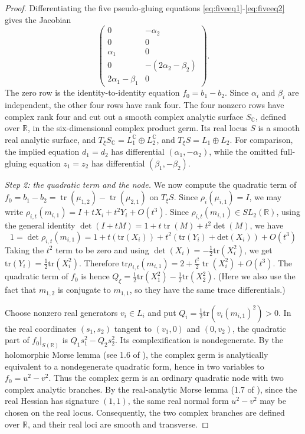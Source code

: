 \documentclass{article}
\DeclareMathOperator{\tr}{tr}
\theoremstyle{plain}
\theoremstyle{definition}
\theoremstyle{plain}
\theoremstyle{plain}
\theoremstyle{plain}
\theoremstyle{remark}
\theoremstyle{remark}
\theoremstyle{plain}
\theoremstyle{plain}
\theoremstyle{plain}
\theoremstyle{plain}
\begin{document}
\begin{proof}
Differentiating the five pseudo-gluing equations \eqref{eq:fiveeq1}-\eqref{eq:fiveeq2} gives the Jacobian
\begin{equation}\label{eq:gluingjacobian} \begin{pmatrix} 0&-\alpha_2\\ 0&0\\ \alpha_1&0\\ 0&-(2\alpha_2-\beta_2)\\ 2\alpha_1-\beta_1&0 \end{pmatrix}. \end{equation}
The zero row is the identity-to-identity equation $f_0 = b_1 - b_2$. Since $\alpha_i$ and  $\beta_i$ are independent, the other four rows have rank four. The four nonzero rows have complex rank four and cut out a smooth complex analytic surface $S_{\mathbb C}$, defined over $\mathbb R$, in the six-dimensional complex product germ. Its real locus $S$ is a smooth real analytic surface, and $T_\xi S_{\mathbb C} = L_1^{\mathbb C} \oplus L_2^{\mathbb C}$, and $T_\xi S = L_1 \oplus L_2$. For comparison, the implied equation $d_1=d_2$ has differential $(\alpha_1, -\alpha_2)$, while the omitted full-gluing equation $z_1=z_2$ has differential $(\beta_1, -\beta_2)$.
	
\medskip

\emph{Step 2: the quadratic term and the node.} We now compute the quadratic term of $f_0=b_1-b_2 = \tr(\mu_{1,2})-\tr(\mu_{2,1})$ on $T_\xi S$. Since $\rho_i(\mu_{i,1}) = I$, we may write $\rho_{i,t}(m_{i,1}) = I + tX_i + t^2Y_i + O(t^3)$. Since $\rho_{i,t}(m_{i,1}) \in SL_2(\mathbb{R})$, using the general identity $\det(I + tM) = 1 + t\tr(M) + t^2\det(M)$, we have
\begin{equation*}
	1 = \det\rho_{i,t}(m_{i,1}) = 1 + t(\mathrm{tr}(X_i)) + t^2(\mathrm{tr}(Y_i) + \mathrm{det}(X_i)) + O(t^3)
\end{equation*} 
Taking the $t^2$ term to be zero and using $\det(X_i) = -\frac12\mathrm{tr}(X_i^2)$, we get $\mathrm{tr}(Y_i)=\frac12\mathrm{tr}(X_i^2)$. Therefore $\mathrm{tr}\rho_{i,t}(m_{i,1}) = 2+\frac{t^2}{2}\operatorname{tr}(X_i^2)+O(t^3)$. The quadratic term of $f_0$ is hence $Q_\xi = \frac12\mathrm{tr}(X_1^2) - \frac12\mathrm{tr}(X_2^2)$. (Here we also use the fact that $m_{1,2}$ is conjugate to $m_{1,1}$, so they have the same trace differentials.)

\medskip
	
Choose nonzero real generators $v_i \in L_i$ and put $Q_i = \frac12\mathrm{tr}(v_i(m_{i,1})^2) > 0$. In the real coordinates $(s_1, s_2)$ tangent to $(v_1, 0)$ and $(0, v_2)$, the quadratic part of $f_0|_{S(\mathbb R)}$ is $Q_1s_1^2 - Q_2s_2^2$. Its complexification is nondegenerate. By the holomorphic Morse lemma (see 1.6 of \cite{morse}), the complex germ is analytically equivalent to a nondegenerate quadratic form, hence in two variables to $f_0 = u^2 - v^2$. Thus the complex germ is an ordinary quadratic node with two complex analytic branches. By the real-analytic Morse lemma (1.7 of \cite{morse}), since the real Hessian has signature $(1, 1)$, the same real normal form $u^2 - v^2$ may be chosen on the real locus. Consequently, the two complex branches are defined over $\mathbb R$, and their real loci are smooth and transverse.  


\end{proof}
\end{document}
